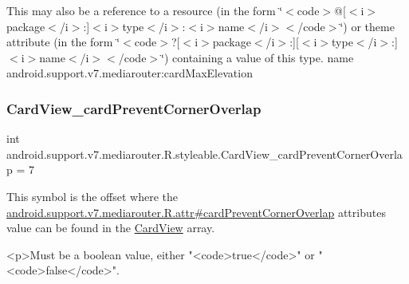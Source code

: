 This may also be a reference to a resource (in the form \char`\"{}$<$code$>$@\mbox{[}$<$i$>$package$<$/i$>$\+:\mbox{]}$<$i$>$type$<$/i$>$\+:$<$i$>$name$<$/i$>$$<$/code$>$\char`\"{}) or theme attribute (in the form \char`\"{}$<$code$>$?\mbox{[}$<$i$>$package$<$/i$>$\+:\mbox{]}\mbox{[}$<$i$>$type$<$/i$>$\+:\mbox{]}$<$i$>$name$<$/i$>$$<$/code$>$\char`\"{}) containing a value of this type.  name android.\+support.\+v7.\+mediarouter\+:card\+Max\+Elevation \mbox{\label{classandroid_1_1support_1_1v7_1_1mediarouter_1_1R_1_1styleable_a454848c21083964d3e8349b51be1943e}} 
\subsubsection{\texorpdfstring{Card\+View\+\_\+card\+Prevent\+Corner\+Overlap}{CardView\_cardPreventCornerOverlap}}
{\footnotesize\ttfamily int android.\+support.\+v7.\+mediarouter.\+R.\+styleable.\+Card\+View\+\_\+card\+Prevent\+Corner\+Overlap = 7\hspace{0.3cm}{\ttfamily [static]}}

This symbol is the offset where the \hyperlink{classandroid_1_1support_1_1v7_1_1mediarouter_1_1R_1_1attr_a0cda2b5a90fa880c0f5aee355536576b}{android.\+support.\+v7.\+mediarouter.\+R.\+attr\#card\+Prevent\+Corner\+Overlap} attribute\textquotesingle{}s value can be found in the \hyperlink{classandroid_1_1support_1_1v7_1_1mediarouter_1_1R_1_1styleable_a58720bc744e6374c25e81b8ae15a2c6a}{Card\+View} array.

\begin{DoxyVerb}      <p>Must be a boolean value, either "<code>true</code>" or "<code>false</code>".
\end{DoxyVerb}
 

